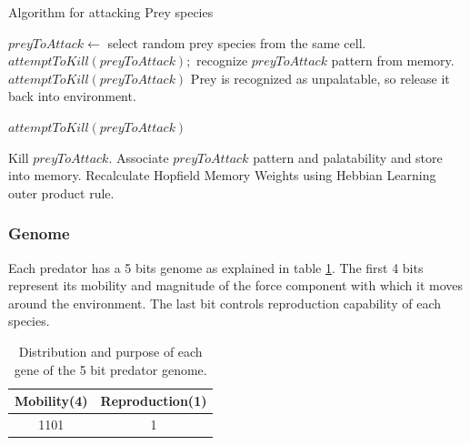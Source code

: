 \documentclass[letterpaper]{article}
\numberwithin{equation}{section}
\begin{document}
\begin{algorithm}
	\caption{Algorithm for attacking Prey species}
	\label{algo:algorithm-attack-prey}
	\begin{algorithmic}
				\STATE $preyToAttack \gets$ select random prey species from the same cell.
					\STATE $attemptToKill(preyToAttack);$ 
				\ELSE
					\STATE recognize $preyToAttack$ pattern from memory.
						\STATE $attemptToKill(preyToAttack)$
					\ELSE 
						\STATE Prey is recognized as unpalatable, so release it back into environment.
					\ENDIF
				\ENDIF
			\ENDIF
		\ENDFOR
	\end{algorithmic}
\end{algorithm}

\begin{algorithm}
	\caption{$attemptToKill(preyToAttack)$}
	\label{algo:algorithm-attemptToKill}
	\begin{algorithmic}
		\STATE Kill $preyToAttack$.
		\IF {Memory size $< MaxMemorySize$}
			\STATE Associate $preyToAttack$ pattern and palatability and store into memory.
			\STATE Recalculate Hopfield Memory Weights using Hebbian Learning outer product rule.
		\ENDIF
	\end{algorithmic}	
\end{algorithm}

\subsubsection{Genome}
Each predator has a 5 bits genome as explained in table \ref{tab:predator-genome}. The first 4 bits represent its mobility and magnitude of the force component with which it moves around the environment. The last bit controls reproduction capability of each species.

\begin{table}[H]
\centering
\begin{tabular}{|c|c|}
	\hline
		\textbf{Mobility(4)} & \textbf{Reproduction(1)} \\ \hline
				 1101					   &					1						 		\\ \hline
\end{tabular}
\caption{Distribution and purpose of each gene of the 5 bit predator genome.}
\label{tab:predator-genome}
\end{table}
\end{document}

